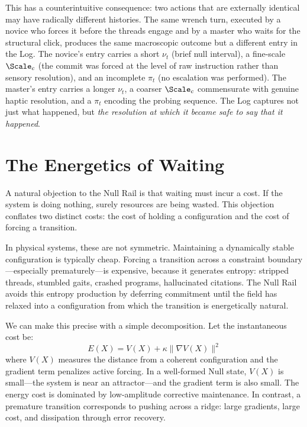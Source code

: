\documentclass[11pt,oneside]{book}
\begin{document}
This has a counterintuitive consequence: two actions that are externally identical may have radically different histories. The same wrench turn, executed by a novice who forces it before the threads engage and by a master who waits for the structural click, produces the same macroscopic outcome but a different entry in the Log. The novice's entry carries a short $\nu_t$ (brief null interval), a fine-scale $\Scale_c$ (the commit was forced at the level of raw instruction rather than sensory resolution), and an incomplete $\pi_t$ (no escalation was performed). The master's entry carries a longer $\nu_t$, a coarser $\Scale_c$ commensurate with genuine haptic resolution, and a $\pi_t$ encoding the probing sequence. The Log captures not just what happened, but \textit{the resolution at which it became safe to say that it happened}.

\section{The Energetics of Waiting}

A natural objection to the Null Rail is that waiting must incur a cost. If the system is doing nothing, surely resources are being wasted. This objection conflates two distinct costs: the cost of holding a configuration and the cost of forcing a transition.

In physical systems, these are not symmetric. Maintaining a dynamically stable configuration is typically cheap. Forcing a transition across a constraint boundary---especially prematurely---is expensive, because it generates entropy: stripped threads, stumbled gaits, crashed programs, hallucinated citations. The Null Rail avoids this entropy production by deferring commitment until the field has relaxed into a configuration from which the transition is energetically natural.

We can make this precise with a simple decomposition. Let the instantaneous cost be:
\begin{equation}
    E(X) = V(X) + \kappa \|\nabla V(X)\|^2
\end{equation}
where $V(X)$ measures the distance from a coherent configuration and the gradient term penalizes active forcing. In a well-formed Null state, $V(X)$ is small---the system is near an attractor---and the gradient term is also small. The energy cost is dominated by low-amplitude corrective maintenance. In contrast, a premature transition corresponds to pushing across a ridge: large gradients, large cost, and dissipation through error recovery.
\end{document}
